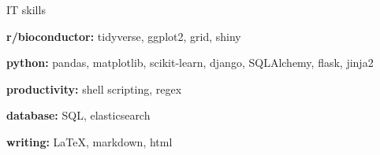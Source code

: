 

\begin{cvskills}
  \cvskill
    {IT skills} %
    {
      \begin{cvitems}
        \item {\textbf{r/bioconductor:} tidyverse, ggplot2, grid, shiny}
        \item {\textbf{python:} pandas, matplotlib, scikit-learn, django, SQLAlchemy, flask, jinja2}
        \item {\textbf{productivity:} shell scripting, regex}
        \item {\textbf{database:} SQL, elasticsearch}
        \item {\textbf{writing:} LaTeX, markdown, html}
      \end{cvitems}
      }
      

\end{cvskills}
